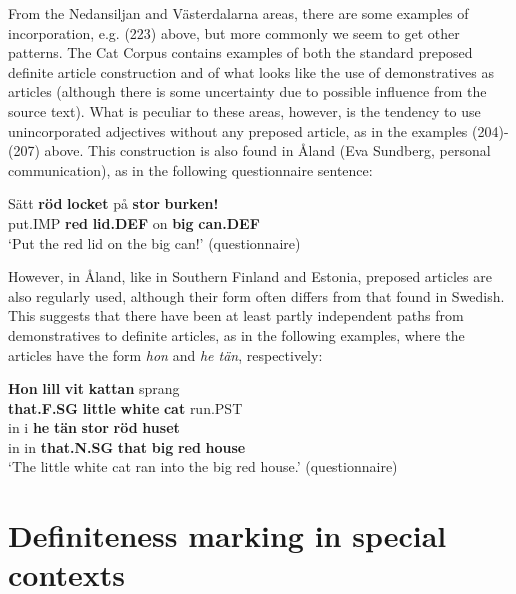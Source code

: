 {%

From the Nedansiljan and Västerdalarna areas, there are some examples of incorporation, e.g. (223) above, but more commonly we seem to get other patterns. The Cat Corpus contains examples of both the standard preposed definite article construction and of what looks like the use of demonstratives as articles (although there is some uncertainty due to possible influence from the source text). What is peculiar to these areas, however, is the tendency to use unincorporated adjectives without any preposed article, as in the examples (204){}-(207) above. This construction is also found in Åland (Eva Sundberg, personal communication), as in the following questionnaire sentence:


\ea\label{}
\gll Sätt  \textbf{röd} \textbf{locket} på  \textbf{stor} \textbf{burken!}\\
put.IMP  \textbf{red} \textbf{lid.DEF} on  \textbf{big} \textbf{can.DEF}\\
\glt ‘Put the red lid on the big can!’ (questionnaire)
\z

However, in Åland, like in Southern Finland and Estonia, preposed articles are also regularly used, although their form often differs from that found in Swedish. This suggests that there have been at least partly independent paths from demonstratives to definite articles, as in the following examples, where the articles have the form \textit{hon} and \textit{he tän}, respectively:


\ea\label{}
\gll \textbf{Hon} \textbf{lill} \textbf{vit} \textbf{kattan} sprang\\
\textbf{that.F.SG} \textbf{little} \textbf{white} \textbf{cat} run.PST\\
\gll in  i  \textbf{he} \textbf{tän} \textbf{stor} \textbf{röd} \textbf{huset} \\
in  in  \textbf{that.N.SG} \textbf{that} \textbf{big} \textbf{red} \textbf{house} \\
\glt  ‘The little white cat ran into the big red house.’ (questionnaire)
\z

\section{Definiteness marking in special contexts}

}
